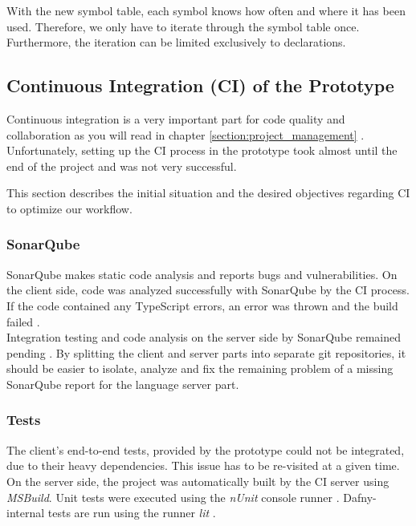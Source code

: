 With the new symbol table, each symbol knows how often and where it has been used.
Therefore, we only have to iterate through the symbol table once.
Furthermore, the iteration can be limited exclusively to declarations.

\subsection{Continuous Integration (CI) of the Prototype}
\label{section:analysis:CI}
Continuous integration is a very important part for code quality and collaboration
as you will read in chapter \ref{section:project_management} \textendash{} .
Unfortunately, setting up the CI process in the prototype took almost until the end of the project
and was not very successful. 

This section describes the initial situation and the desired objectives regarding CI to optimize our workflow.

\subsubsection{SonarQube}
SonarQube makes static code analysis and reports bugs and vulnerabilities.
On the client side, code was analyzed successfully with SonarQube by the CI process.
If the code contained any TypeScript errors, an error was thrown and the build failed \cite{sa}. \\

Integration testing and code analysis on the server side by SonarQube remained pending \cite{sa}.
By splitting the client and server parts into separate git repositories,
it should be easier to isolate, analyze and fix the remaining problem of a missing SonarQube report for the language server part.

\subsubsection{Tests}
The client's end-to-end tests, provided by the prototype could not be integrated, due to their heavy dependencies.
This issue has to be re-visited at a given time. \\

On the server side, the project was automatically built by the CI server using \textit{MSBuild}.  
Unit tests were executed using the \textit{nUnit} console runner \cite{nunit}.  
Dafny-internal tests are run using the runner \textit{lit} \cite{lit}.

